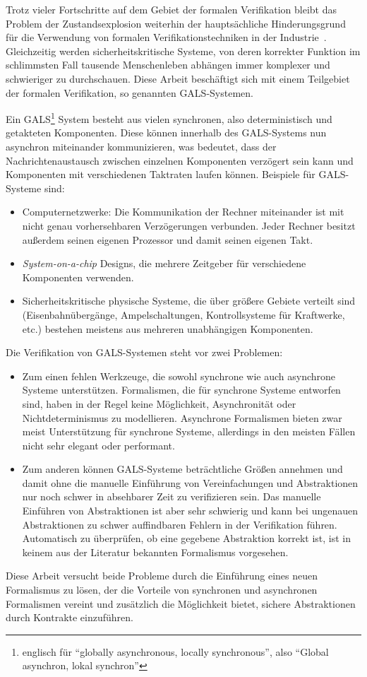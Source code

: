 Trotz vieler Fortschritte auf dem Gebiet der formalen Verifikation bleibt das Problem der Zustandsexplosion weiterhin der hauptsächliche Hinderungsgrund für die Verwendung von formalen Verifikationstechniken in der Industrie~\cite{state_explosion}.
Gleichzeitig werden sicherheitskritische Systeme, von deren korrekter Funktion im schlimmsten Fall tausende Menschenleben abhängen immer komplexer und schwieriger zu durchschauen.
Diese Arbeit beschäftigt sich mit einem Teilgebiet der formalen Verifikation, so genannten GALS-Systemen.

Ein GALS\footnote{englisch für "`globally asynchronous, locally synchronous"', also "`Global asynchron, lokal synchron"'} System besteht aus vielen synchronen, also deterministisch und getakteten Komponenten.
Diese können innerhalb des GALS-Systems nun asynchron miteinander kommunizieren, was bedeutet, dass der Nachrichtenaustausch zwischen einzelnen Komponenten verzögert sein kann und Komponenten mit verschiedenen Taktraten laufen können.
Beispiele für GALS-Systeme sind:
\begin{itemize}
\item Computernetzwerke: Die Kommunikation der Rechner miteinander ist mit nicht genau vorhersehbaren Verzögerungen verbunden.
  Jeder Rechner besitzt außerdem seinen eigenen Prozessor und damit seinen eigenen Takt.
\item \emph{System-on-a-chip} Designs, die mehrere Zeitgeber für verschiedene Komponenten verwenden.
\item Sicherheitskritische physische Systeme, die über größere Gebiete verteilt sind (Eisenbahnübergänge, Ampelschaltungen, Kontrollsysteme für Kraftwerke, etc.) bestehen meistens aus mehreren unabhängigen Komponenten.
\end{itemize}

Die Verifikation von GALS-Systemen steht vor zwei Problemen:
\begin{itemize}
\item Zum einen fehlen Werkzeuge, die sowohl synchrone wie auch asynchrone Systeme unterstützen.
  Formalismen, die für synchrone Systeme entworfen sind, haben in der Regel keine Möglichkeit, Asynchronität oder Nichtdeterminismus zu modellieren.
  Asynchrone Formalismen bieten zwar meist Unterstützung für synchrone Systeme, allerdings in den meisten Fällen nicht sehr elegant oder performant.
\item Zum anderen können GALS-Systeme beträchtliche Größen annehmen und damit ohne die manuelle Einführung von Vereinfachungen und Abstraktionen nur noch schwer in absehbarer Zeit zu verifizieren sein.
  Das manuelle Einführen von Abstraktionen ist aber sehr schwierig und kann bei ungenauen Abstraktionen zu schwer auffindbaren Fehlern in der Verifikation führen.
  Automatisch zu überprüfen, ob eine gegebene Abstraktion korrekt ist, ist in keinem aus der Literatur bekannten Formalismus vorgesehen.
\end{itemize}
Diese Arbeit versucht beide Probleme durch die Einführung eines neuen Formalismus zu lösen, der die Vorteile von synchronen und asynchronen Formalismen vereint und zusätzlich die Möglichkeit bietet, sichere Abstraktionen durch Kontrakte einzuführen.

